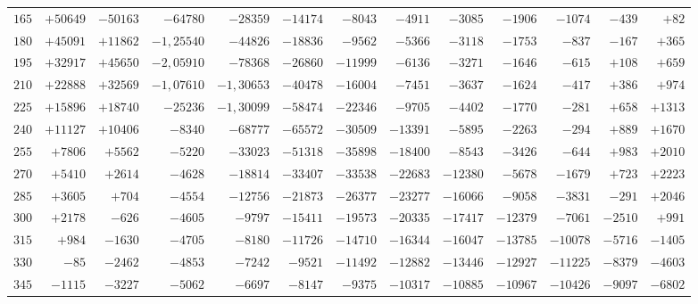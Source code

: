 \begin{landscape}
\begin{center}
\begin{tabular}{@{}r|*{11}{r|}r@{}}
\(165\) & \(+50649\) & \(-50163\) & \(-64780\) & \(-28359\) & \(-14174\) & \(-8043\) & \(-4911\) & \(-3085\) & \(-1906\) & \(-1074\) & \(-439\) & \(+82\)\\
\(180\) & \(+45091\) & \(+11862\) & \(-1{,}25540\) & \(-44826\) & \(-18836\) & \(-9562\) & \(-5366\) & \(-3118\) & \(-1753\) & \(-837\) & \(-167\) & \(+365\)\\
\(195\) & \(+32917\) & \(+45650\) & \(-2{,}05910\) & \(-78368\) & \(-26860\) & \(-11999\) & \(-6136\) & \(-3271\) & \(-1646\) & \(-615\) & \(+108\) & \(+659\)\\
\(210\) & \(+22888\) & \(+32569\) & \(-1{,}07610\) & \(-1{,}30653\) & \(-40478\) & \(-16004\) & \(-7451\) & \(-3637\) & \(-1624\) & \(-417\) & \(+386\) & \(+974\)\\
\(225\) & \(+15896\) & \(+18740\) & \(-25236\) & \(-1{,}30099\) & \(-58474\) & \(-22346\) & \(-9705\) & \(-4402\) & \(-1770\) & \(-281\) & \(+658\) & \(+1313\)\\
\(240\) & \(+11127\) & \(+10406\) & \(-8340\) & \(-68777\) & \(-65572\) & \(-30509\) & \(-13391\) & \(-5895\) & \(-2263\) & \(-294\) & \(+889\) & \(+1670\)\\
\(255\) & \(+7806\) & \(+5562\) & \(-5220\) & \(-33023\) & \(-51318\) & \(-35898\) & \(-18400\) & \(-8543\) & \(-3426\) & \(-644\) & \(+983\) & \(+2010\)\\
\(270\) & \(+5410\) & \(+2614\) & \(-4628\) & \(-18814\) & \(-33407\) & \(-33538\) & \(-22683\) & \(-12380\) & \(-5678\) & \(-1679\) & \(+723\) & \(+2223\)\\
\(285\) & \(+3605\) & \(+704\) & \(-4554\) & \(-12756\) & \(-21873\) & \(-26377\) & \(-23277\) & \(-16066\) & \(-9058\) & \(-3831\) & \(-291\) & \(+2046\)\\
\(300\) & \(+2178\) & \(-626\) & \(-4605\) & \(-9797\) & \(-15411\) & \(-19573\) & \(-20335\) & \(-17417\) & \(-12379\) & \(-7061\) & \(-2510\) & \(+991\)\\
\(315\) & \(+984\) & \(-1630\) & \(-4705\) & \(-8180\) & \(-11726\) & \(-14710\) & \(-16344\) & \(-16047\) & \(-13785\) & \(-10078\) & \(-5716\) & \(-1405\)\\
\(330\) & \(-85\) & \(-2462\) & \(-4853\) & \(-7242\) & \(-9521\) & \(-11492\) & \(-12882\) & \(-13446\) & \(-12927\) & \(-11225\) & \(-8379\) & \(-4603\)\\
\(345\) & \(-1115\) & \(-3227\) & \(-5062\) & \(-6697\) & \(-8147\) & \(-9375\) & \(-10317\) & \(-10885\) & \(-10967\) & \(-10426\) & \(-9097\) & \(-6802\)\\
\end{tabular}

\end{center}
\end{landscape}
